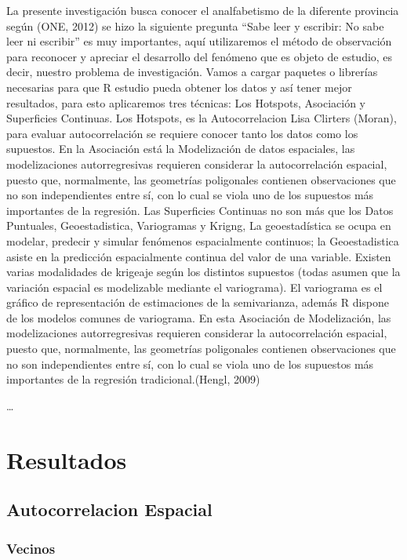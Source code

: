 \documentclass[11pt,]{article}
\begin{document}
La presente investigación busca conocer el analfabetismo de la diferente
provincia según (ONE, 2012) se hizo la siguiente pregunta ``Sabe leer y
escribir: No sabe leer ni escribir'' es muy importantes, aquí
utilizaremos el método de observación para reconocer y apreciar el
desarrollo del fenómeno que es objeto de estudio, es decir, nuestro
problema de investigación. Vamos a cargar paquetes o librerías
necesarias para que R estudio pueda obtener los datos y así tener mejor
resultados, para esto aplicaremos tres técnicas: Los Hotspots,
Asociación y Superficies Continuas. Los Hotspots, es la Autocorrelacion
Lisa Clirters (Moran), para evaluar autocorrelación se requiere conocer
tanto los datos como los supuestos. En la Asociación está la
Modelización de datos espaciales, las modelizaciones autorregresivas
requieren considerar la autocorrelación espacial, puesto que,
normalmente, las geometrías poligonales contienen observaciones que no
son independientes entre sí, con lo cual se viola uno de los supuestos
más importantes de la regresión. Las Superficies Continuas no son más
que los Datos Puntuales, Geoestadistica, Variogramas y Krigng, La
geoestadística se ocupa en modelar, predecir y simular fenómenos
espacialmente continuos; la Geoestadistica asiste en la predicción
espacialmente continua del valor de una variable. Existen varias
modalidades de krigeaje según los distintos supuestos (todas asumen que
la variación espacial es modelizable mediante el variograma). El
variograma es el gráfico de representación de estimaciones de la
semivarianza, además R dispone de los modelos comunes de variograma. En
esta Asociación de Modelización, las modelizaciones autorregresivas
requieren considerar la autocorrelación espacial, puesto que,
normalmente, las geometrías poligonales contienen observaciones que no
son independientes entre sí, con lo cual se viola uno de los supuestos
más importantes de la regresión tradicional.(Hengl, 2009)

\ldots

\section{Resultados}\label{resultados}

\subsection{Autocorrelacion Espacial}\label{autocorrelacion-espacial}

\subsubsection{Vecinos}\label{vecinos}
\end{document}
